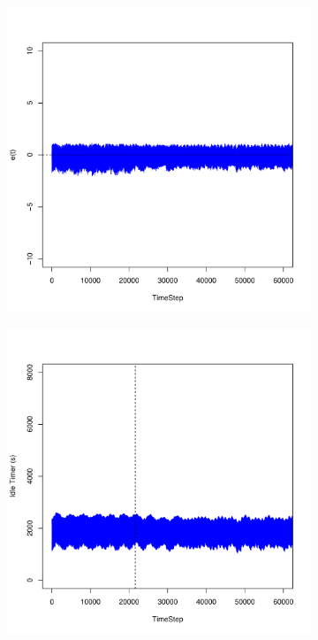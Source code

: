 \documentclass[a4j]{ujarticle}
\begin{document}
\begin{figure}[htbp]
 \centering
 \begin{subfigure}{0.49\hsize}
   \centering
   \includegraphics[width=1.0\hsize]{scenario_6_e_345600_691200_1-8_0-00045_1800_0_ideal_add_80000.pdf}
   \label{subfig:scenario_6_e_345600_691200_1-8_0-00045_1800_0_ideal_add_80000}
 \end{subfigure}
 \begin{subfigure}{0.49\hsize}
   \centering
   \includegraphics[width=1.0\hsize]{scenario_6_idleTimer_345600_691200_1-8_0-00045_1800_0_ideal_add_80000.pdf}

\end{subfigure}
\end{figure}
\end{document}
